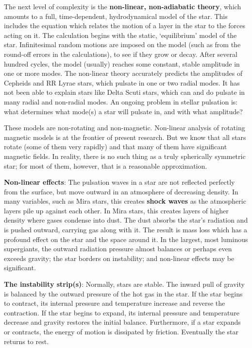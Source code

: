 \documentclass[a4paper,10pt]{article}
\begin{document}
{\noindent}The next level of complexity is the \textbf{non-linear, non-adiabatic theory}, which amounts to a full, time-dependent, hydrodynamical model of the star. This includes the equation which relates the motion of a layer in the star to the forces acting on it. The calculation begins with the static, `equilibrium' model of the star. Infinitesimal random motions are imposed on the model (such as from the round-off errors in the calculations), to see if they grow or decay. After several hundred cycles, the model (usually) reaches some constant, stable amplitude in one or more modes. The non-linear theory accurately predicts the amplitudes of Cepheids and RR Lyrae stars, which pulsate in one or two radial modes. It has not been able to explain stars like Delta Scuti stars, which can and do pulsate in many radial and non-radial modes. An ongoing problem in stellar pulsation is: what determines what mode(s) a star will pulsate in, and with what amplitude?

{\noindent}These models are non-rotating and non-magnetic. Non-linear analysis of rotating magnetic models is at the frontier of present research. But we know that all stars rotate (some of them very rapidly) and that many of them have significant magnetic fields. In reality, there is no such thing as a truly spherically symmetric star; for most of them, however, that is a reasonable approximation.

{\noindent}\textbf{Non-linear effects}: The pulsation waves in a star are not reflected perfectly from the surface, but move outward in an atmosphere of decreasing density. In many variables, such as Mira stars, this creates \textbf{shock waves} as the atmospheric layers pile up against each other. In Mira stars, this creates layers of higher density where gases condense into dust. The dust absorbs the star's radiation and is pushed outward, carrying gas along with it. The result is mass loss which has a profound effect on the star and the space around it. In the largest, most luminous supergiants, the outward radiation pressure almost balances or perhaps even exceeds gravity; the star borders on instability; and non-linear effects may be significant.

{\noindent}\textbf{The instability strip(s)}: Normally, stars are stable. The inward pull of gravity is balanced by the outward pressure of the hot gas in the star. If the star begins to contract, its internal pressure and temperature increase and reverse the contraction. If the star begins to expand, its internal pressure and temperature decrease and gravity restores the initial balance. Furthermore, if a star expands or contracts, the energy of motion is dissipated by friction. Eventually the star returns to rest.
\end{document}
